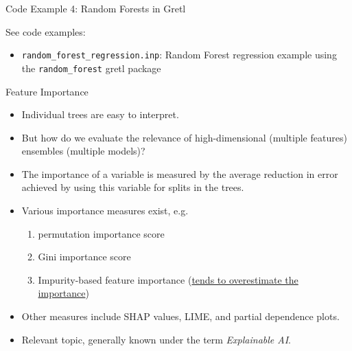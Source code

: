 \documentclass[11pt]{beamer}
\begin{document}
\begin{frame}{Code Example 4: Random Forests in Gretl}

	See code examples:
	\vspace{0.25cm}

	\begin{itemize}
		\setlength{\itemsep}{0.15cm}
		\item \texttt{random\_forest\_regression.inp}: Random Forest regression example using the \texttt{random\_forest} gretl package
	\end{itemize}

\end{frame}


\begin{frame}{Feature Importance}
	\begin{itemize}
		\item Individual trees are easy to interpret.
		\item But how do we evaluate the relevance of high-dimensional (multiple features) ensembles (multiple models)?
		\item The importance of a variable is measured by the average reduction in error achieved by using this variable for splits in the trees.
		\item Various importance measures exist, e.g.
		\begin{enumerate}
			\item permutation importance score
			\item Gini importance score
			\item Impurity-based feature importance (\href{https://scikit-learn.org/stable/auto_examples/inspection/plot_permutation_importance.html}{tends to overestimate the importance})
		\end{enumerate}
		\item Other measures include SHAP values, LIME, and partial dependence plots.
		\item Relevant topic, generally known under the term \emph{Explainable AI}.
	\end{itemize}
\end{frame}
\end{document}
